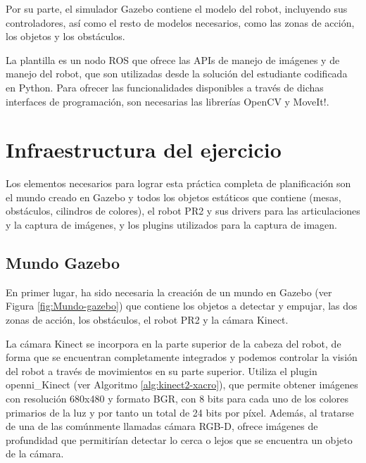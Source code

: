 \documentclass[12pt,spanish,chapterprefix, numbers=noenddot]{book}
\numberwithin{equation}{section}
\numberwithin{figure}{section}
\begin{document}
Por su parte, el simulador Gazebo contiene el modelo del robot, incluyendo sus controladores, así como el resto de modelos necesarios, como las zonas de acción, los objetos y los obstáculos.  

La plantilla es un nodo ROS que ofrece las APIs de manejo de imágenes y de manejo del robot, que son utilizadas desde la solución del estudiante codificada en Python. Para ofrecer las funcionalidades disponibles a través de dichas interfaces de programación, son necesarias las librerías OpenCV y MoveIt!.

\section{Infraestructura del ejercicio}\label{sec:infraestructura}
Los elementos necesarios para lograr esta práctica completa de planificación son el mundo creado en Gazebo y todos los objetos estáticos que contiene (mesas, obstáculos, cilindros de colores), el robot PR2 y sus drivers para las articulaciones y la captura de imágenes, y los plugins utilizados para la captura de imagen.  

\subsection{Mundo Gazebo}
En primer lugar, ha sido necesaria la creación de un mundo en Gazebo (ver Figura \ref{fig:Mundo-gazebo}) que contiene los objetos a detectar y empujar, las dos zonas de acción, los obstáculos, el robot PR2 y la cámara Kinect.

La cámara Kinect se incorpora en la parte superior de la cabeza del robot, de forma que se encuentran completamente integrados y podemos controlar la visión del robot a través de movimientos en su parte superior.
Utiliza el plugin openni\_Kinect (ver Algoritmo \ref{alg:kinect2-xacro}), que permite obtener imágenes con resolución 680x480 y formato BGR, con 8 bits para cada uno de los colores primarios de la luz y por tanto un total de 24 bits por píxel. Además, al tratarse de una de las comúnmente llamadas cámara RGB-D, ofrece imágenes de profundidad que permitirían detectar lo cerca o lejos que se encuentra un objeto de la cámara. 
\end{document}
